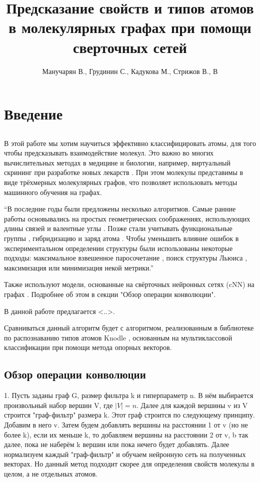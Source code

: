 \documentclass[12pt,twoside]{article}
\title
    [] %
    {Предсказание свойств и типов атомов в молекулярных графах при помощи сверточных сетей}
\author
    [] %
    {Манучарян В., Грудинин С., Кадукова М., Стрижов В., В} %
    [Манучарян В., Грудинин С., Кадукова М., Стрижов В., В] %
\begin{document}
\maketitle
\section{Введение}
\subsection{}
	В этой работе мы хотим научиться эффективно классифицировать атомы, для того чтобы предсказывать взаимодействие молекул. Это важно во многих вычислительных методах в медицине и биологии, например, виртуальный скрининг при разработке новых лекарств \cite{article2}. При этом молекулы представимы в виде трёхмерных молекулярных графов, что позволяет использовать методы машинного обучения на графах.
	
	“В последние годы были предложены несколько алгоритмов. Самые ранние работы основывались на простых геометрических соображениях, использующих длины связей и валентные углы \cite{article3}. Позже стали учитывать функциональные группы \cite{article4}, гибридизацию и заряд атома \cite{article5,article6,article7,article8}. Чтобы уменьшить влияние ошибок в экспериментальном определении структуры были использованы некоторые подходы: максимальное взвешенное паросочетание \cite{article9,article10}, поиск структуры Льюиса \cite{article11}, максимизация \cite{article12} или минимизация \cite{article13,article14} некой метрики.”
	
	Также используют модели, основанные на свёрточных нейронных сетях (cNN) на графах \cite{article15,article16,article20}. Подробнее об этом в секции "Обзор операции конволюции".
	
	В данной работе предлагается <..>.
	
	Сравниваться данный алгоритм будет с алгоритмом, реализованным в библиотеке по распознаванию типов атомов Knodle \cite{article1}, основанным на мультиклассовой классификации при помощи метода опорных векторов.
	
\subsection{Обзор операции конволюции}
1. Пусть заданы граф G, размер фильтра k и гиперпараметр n. В нём выбирается произвольный набор вершин V, где $|V|=n$. Далее для каждой вершины v из V строится "граф-фильтр" размера k. Этот граф строится по следующему принципу. Добавим в него v. Затем будем добавлять вершины на расстоянии 1 от v (но не более k), если их меньше k, то добавляем вершины на расстоянии 2 от v, b так далее, пока не наберём k вершин или пока нечего будет добавлять. Далее нормализуем каждый "граф-фильтр" и обучаем нейронную сеть на полученных векторах.\cite{article15} Но данный метод подходит скорее для определения свойств молекулы в целом, а не отдельных атомов.
\end{document}
